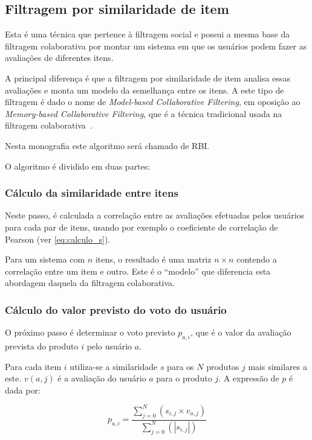 \subsection{Filtragem por similaridade de item}

Esta é uma técnica que pertence à filtragem social e possui a mesma base da filtragem colaborativa por montar um sistema em que os usuários podem fazer as avaliações de diferentes itens.

A principal diferença é que a filtragem por similaridade de item analisa essas avaliações e monta um modelo da semelhança entre os itens. A este tipo de filtragem é dado o nome de \textit{Model-based Collaborative Filtering}, em oposição ao \textit{Memory-based Collaborative Filtering}, que é a técnica tradicional usada na filtragem colaborativa~\cite{sarwar01}.

Nesta monografia este algoritmo será chamado de RBI.

O algoritmo é dividido em duas partes:

\subsubsection{Cálculo da similaridade entre itens}

Neste passo, é calculada a correlação entre as avaliações efetuadas pelos usuários para cada par de itens, usando por exemplo o coeficiente de correlação de Pearson (ver \ref{eq:calculo_s}).

Para um sistema com $n$ itens, o resultado é uma matriz $n \times n$ contendo a correlação entre um item e outro. Este é o ``modelo'' que diferencia esta abordagem daquela da filtragem colaborativa.

\subsubsection{Cálculo do valor previsto do voto do usuário}

O próximo passo é determinar o voto previsto $p_{a,i}$, que é o valor da avaliação prevista do produto $i$ pelo usuário $a$.

Para cada item $i$ utiliza-se a similaridade $s$ para os $N$ produtos $j$ mais similares a este. $v(a,j)$ é a avaliação do usuário $a$ para o produto $j$. A expressão de $p$ é dada por:

\begin{equation}
 p_{a,i} = \frac{\sum_{j=0}^N{(s_{i,j} \times v_{a, j})}}{\sum_{j=0}^N{(|s_{i,j}|)}}
 \label{eq:filtragem_item_based} 
\end{equation}

